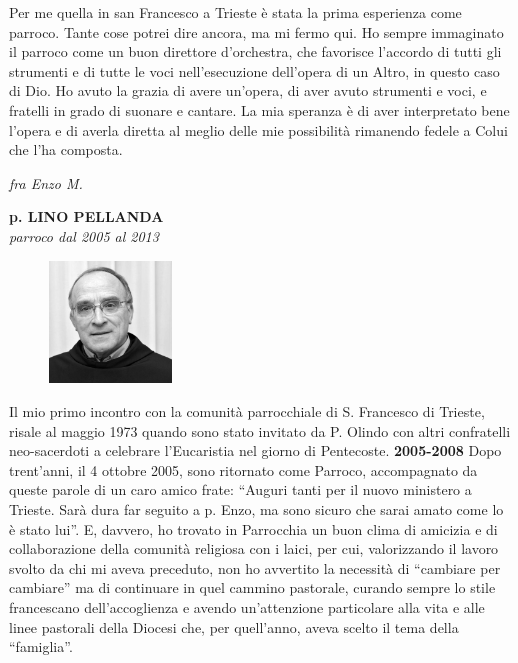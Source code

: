 Per me quella in san Francesco a Trieste è stata la prima esperienza come parroco. Tante cose 
potrei dire ancora, ma mi fermo qui. Ho sempre immaginato il parroco come un buon direttore 
d’orchestra, che favorisce l’accordo di tutti gli strumenti e di tutte le voci nell’esecuzione 
dell’opera di un Altro, in questo caso di Dio. Ho avuto la grazia di avere un’opera, di aver avuto 
strumenti e voci, e fratelli in grado di suonare e cantare. La mia speranza è di aver interpretato 
bene l’opera e di averla diretta al meglio delle mie possibilità rimanendo fedele a Colui che l’ha 
composta.
\begin{flushright}
\textit{fra Enzo M.}
\end{flushright}
\endgroup
\newpage
\begin{center}
\textbf{\Large p. LINO PELLANDA}\\
	\textit{parroco dal 2005 al 2013}
\end{center}
\bigbreak
\begingroup
\setlength\intextsep{0pt}
\begin{figure}
\centering
\includegraphics[width=0.29\textwidth]{immagini/lino.jpg}
\end{figure}
\noindent Il mio primo incontro con la comunità parrocchiale di S. Francesco di Trieste, risale al 
maggio 1973 quando sono stato invitato da P. Olindo con altri confratelli neo-sacerdoti a celebrare 
l'Eucaristia nel giorno di Pentecoste.
\bigbreak
\noindent \textbf{2005-2008}
\medbreak
\noindent Dopo trent'anni, il 4 ottobre 2005, sono ritornato come Parroco, accompagnato da queste 
parole di un caro amico frate: ``Auguri tanti per il nuovo ministero a Trieste. Sarà dura far seguito a 
p. Enzo, ma sono sicuro che sarai amato come lo è stato lui''.
E, davvero, ho trovato in Parrocchia un buon clima di amicizia e di collaborazione della comunità 
religiosa con i laici, per cui, valorizzando il lavoro svolto da chi mi aveva preceduto, non ho 
avvertito la necessità di “cambiare per cambiare” ma di continuare in quel cammino pastorale, 
curando sempre lo stile francescano dell'accoglienza e avendo un'attenzione particolare alla vita e 
alle linee pastorali della Diocesi che, per quell'anno, aveva scelto il tema della “famiglia”.
